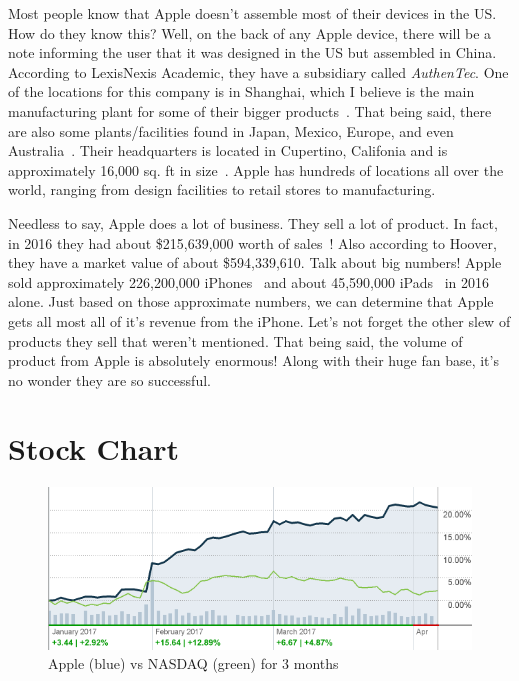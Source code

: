 \documentclass[12pt,a4paper,titlepage]{article}
\begin{document}
Most people know that Apple doesn't assemble most of their devices in the
US. How do they know this? Well, on the back of any Apple device, there will be
a note informing the user that it was designed in the US but assembled in
China. According to LexisNexis Academic, they have a subsidiary called
\emph{AuthenTec}. One of the locations for this company is in Shanghai, which I
believe is the main manufacturing plant for some of their bigger
products~\cite{lexis}. That being said, there are also some plants/facilities
found in Japan, Mexico, Europe, and even Australia~\cite{lexis}. Their
headquarters is located in Cupertino, Califonia and is approximately 16,000
sq. ft in size~\cite{hoover}. Apple has hundreds of locations all over the
world, ranging from design facilities to retail stores to manufacturing.

Needless to say, Apple does a lot of business. They sell a lot of product. In
fact, in 2016 they had about \$215,639,000 worth of sales~\cite{hoover}!  Also
according to Hoover, they have a market value of about \$594,339,610. Talk about
big numbers! Apple sold approximately 226,200,000 iPhones~\cite{lifewire} and
about 45,590,000 iPads~\cite{lifewire2} in 2016 alone. Just based on those
approximate numbers, we can determine that Apple gets all most all of it's
revenue from the iPhone. Let's not forget the other slew of products they sell
that weren't mentioned. That being said, the volume of product from Apple is
absolutely enormous! Along with their huge fan base, it's no wonder they are so
successful.

\newpage

\section{Stock Chart}

\begin{figure}[!htb]
  \centering
  \includegraphics[width=1\textwidth]{apple-chart-3mo}
    \caption{Apple (blue) vs NASDAQ (green) for 3 months~\cite{cnnapple}}
\end{figure}
\end{document}

